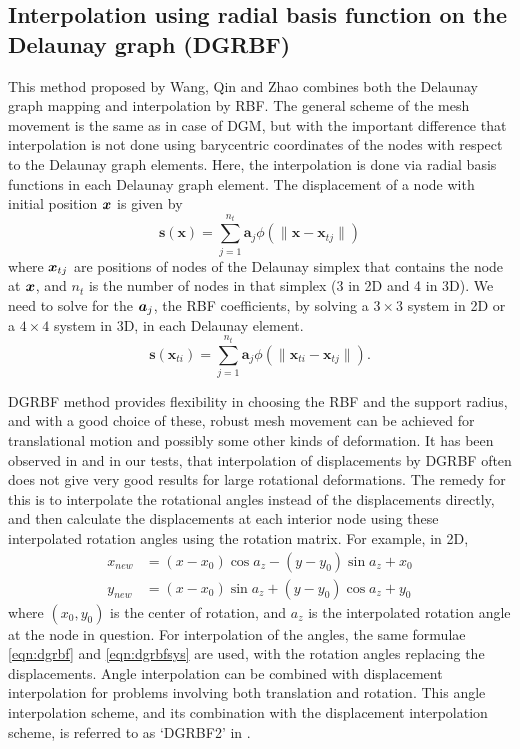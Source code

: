  \subsection[DG-RBF]{Interpolation using radial basis function on the Delaunay graph (DGRBF)}
 This method proposed by Wang, Qin and Zhao \cite{mm:dgrbf} combines both the Delaunay graph mapping and interpolation by RBF. The general scheme of the mesh movement is the same as in case of DGM, but with the important difference that interpolation is not done using barycentric coordinates of the nodes with respect to the Delaunay graph elements. Here, the interpolation is done via radial basis functions in each Delaunay graph element. The displacement of a node with initial position $\boldsymbol{x}$ is given by
 \begin{equation}
 \mathbf{s}(\mathbf{x}) = \sum_{j=1}^{n_t} \mathbf{a}_j \phi(\lVert\mathbf{x} - \mathbf{x}_{tj}\rVert)
 \label{eqn:dgrbf}
 \end{equation}
 where $\boldsymbol{x}_{tj}$ are positions of nodes of the Delaunay simplex that contains the node at $\boldsymbol{x}$, and $n_t$ is the number of nodes in that simplex (3 in 2D and 4 in 3D). We need to solve for the $\boldsymbol{a}_j$, the RBF coefficients, by solving a $3 \times 3$ system in 2D or a $4 \times 4$ system in 3D, in each Delaunay element.
 \begin{equation}
 \mathbf{s}(\mathbf{x}_{ti}) = \sum_{j=1}^{n_t} \mathbf{a}_j \phi(\lVert\mathbf{x}_{ti} - \mathbf{x}_{tj}\rVert).
 \label{eqn:dgrbfsys}
 \end{equation}
 
 DGRBF method provides flexibility in choosing the RBF and the support radius, and with a good choice of these, robust mesh movement can be achieved for translational motion and possibly some other kinds of deformation. It has been observed in \cite{mm:dgrbf} and in our tests, that interpolation of displacements by DGRBF often does not give very good results for large rotational deformations. The remedy for this is to interpolate the rotational angles instead of the displacements directly, and then calculate the displacements at each interior node using these interpolated rotation angles using the rotation matrix. For example, in 2D,
 \begin{align}
 x_{new} &= (x-x_0)\cos a_z - (y-y_0)\sin a_z + x_0 \\
 y_{new} &= (x-x_0)\sin a_z + (y-y_0)\cos a_z + y_0
 \end{align}
 where $(x_0,y_0)$ is the center of rotation, and $a_z$ is the interpolated rotation angle at the node in question. For interpolation of the angles, the same formulae \eqref{eqn:dgrbf} and \eqref{eqn:dgrbfsys} are used, with the rotation angles replacing the displacements. Angle interpolation can be combined with displacement interpolation for problems involving both translation and rotation. This angle interpolation scheme, and its combination with the displacement interpolation scheme, is referred to as `DGRBF2' in \cite{mm:dgrbf}.
 
